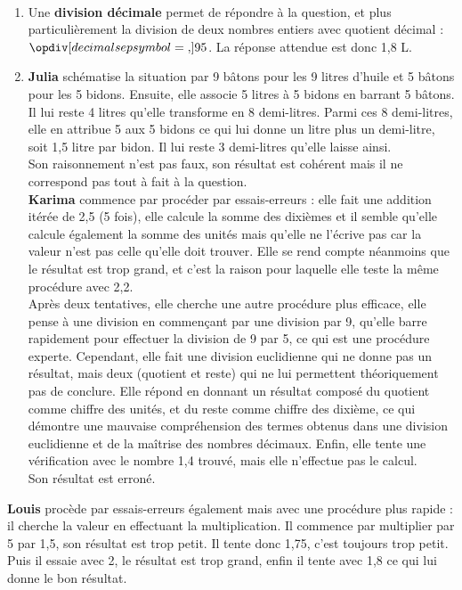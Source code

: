 \ \\ [-5mm]
\begin{enumerate}
   \item Une \textbf{division décimale} permet de répondre à la question, et plus particulièrement la division de deux nombres entiers avec quotient décimal : $\opdiv[decimalsepsymbol={,}]{9}{5}$. \quad La réponse attendue est donc 1,8 L. \\
   \item \textbf{Julia} schématise la situation par 9 bâtons pour les 9 litres d'huile et 5 bâtons pour les 5 bidons. Ensuite, elle associe 5 litres à 5 bidons en barrant 5 bâtons. Il lui reste 4 litres qu'elle transforme en 8 demi-litres. Parmi ces 8 demi-litres, elle en attribue 5 aux 5 bidons ce qui lui donne un litre plus un demi-litre, soit 1,5 litre par bidon. Il lui reste 3 demi-litres qu'elle laisse ainsi. \\
      Son raisonnement n'est pas faux, son résultat est cohérent mais il ne correspond pas tout à fait à la question. \\
   \textbf{Karima} commence par procéder par essais-erreurs : elle fait une addition itérée de 2,5 (5 fois), elle calcule la somme des dixièmes et il semble qu'elle calcule également la somme des unités mais qu'elle ne l'écrive pas car la valeur n'est pas celle qu'elle doit trouver. Elle se rend compte néanmoins que le résultat est trop grand, et c'est la raison pour laquelle elle teste la même procédure avec 2,2. \\
      Après deux tentatives, elle cherche une autre procédure plus efficace, elle pense à une division en commençant par une division par 9, qu'elle barre rapidement pour effectuer la division de 9 par 5, ce qui est une procédure experte. Cependant, elle fait une division euclidienne qui ne donne pas un résultat, mais deux (quotient et reste) qui ne lui permettent théoriquement pas de conclure. Elle répond en donnant un résultat composé du quotient comme chiffre des unités, et du reste comme chiffre des dixième, ce qui démontre une mauvaise compréhension des termes obtenus dans une division euclidienne et de la maîtrise des nombres décimaux. Enfin, elle tente une vérification avec le nombre 1,4 trouvé, mais elle n'effectue pas le calcul. \\
      Son résultat est erroné.
\end{enumerate}
\Coupe
   \textbf{Louis} procède par essais-erreurs également mais avec une procédure plus rapide : il cherche la valeur en effectuant la multiplication. Il commence par multiplier par 5 par 1,5, son résultat est trop petit. Il tente donc 1,75, c'est toujours trop petit. Puis il essaie avec 2, le résultat est trop grand, enfin il tente avec 1,8 ce qui lui donne le bon résultat. \\
